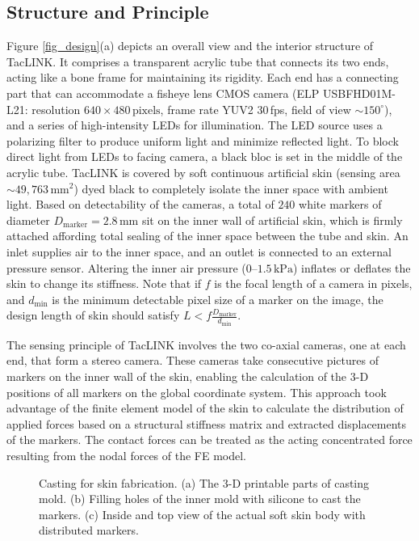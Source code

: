 \documentclass[10pt,letterpaper,journal,final,twoside,twocolumn,nofonttune]{IEEEtran}
\begin{document}
\subsection{Structure and Principle}
Figure \ref{fig_design}(a) depicts an overall view and the interior structure of TacLINK. It comprises a transparent acrylic tube that connects its two ends, acting like a bone frame for maintaining its rigidity. Each end has a connecting part that can accommodate a fisheye lens CMOS camera (ELP USBFHD01M-L21: resolution $640\times480\,\text{pixels}$, frame rate YUV2 $30\,$fps, field of view $\sim{150^{\circ}}$), and a series of high-intensity LEDs for illumination. The LED source uses a polarizing filter to produce uniform light and minimize reflected light. To block direct light from LEDs to facing camera, a black bloc is set in the middle of the acrylic tube. TacLINK is covered by soft continuous artificial skin (sensing area $\sim 49,763\,\text{mm}^2$) dyed black to completely isolate the inner space with ambient light. Based on detectability of the cameras, a total of $240$ white markers of diameter $D_\text{marker}=2.8$\,mm sit on the inner wall of artificial skin, which is firmly attached affording total sealing of the inner space between the tube and skin. An inlet supplies air to the inner space, and an outlet is connected to an external pressure sensor. Altering the inner air pressure ($0\text{--}1.5\,\text{kPa}$) inflates or deflates the skin to change its stiffness. Note that if $f$ is the focal length of a camera in pixels, and $d_{\text{min}}$ is the minimum detectable pixel size of a marker on the image, the design length of skin should satisfy $L<f\frac{D_{\text{marker}}}{d_{\text{min}}}$.


The sensing principle of TacLINK involves the two co-axial cameras, one at each end, that form a stereo camera. These cameras take consecutive pictures of markers on the inner wall of the skin, enabling the calculation of the 3-D positions of all markers on the global coordinate system. This approach took advantage of the finite element model of the skin to calculate the distribution of applied forces based on a structural stiffness matrix and extracted displacements of the markers. The contact forces can be treated as the acting concentrated force resulting from the nodal forces of the FE model.
\begin{figure}[!t]
\centering
\def\svgwidth{1\columnwidth}

\caption{Casting for skin fabrication. (a) The 3-D printable parts of casting mold. (b) Filling holes of the inner mold with silicone to cast the markers. (c) Inside and top view of the actual soft skin body with distributed markers.}
\label{fig_fabrication}
\end{figure}
\end{document}
